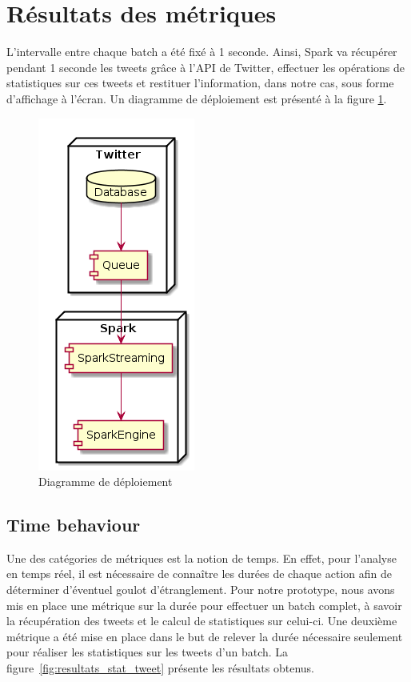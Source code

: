 \section{Résultats des métriques}
  L'intervalle entre chaque batch a été fixé à 1 seconde. Ainsi, Spark va récupérer pendant 1 seconde les tweets grâce à l'API de Twitter, effectuer les opérations de statistiques sur ces tweets et restituer l'information, dans notre cas, sous forme d'affichage à l'écran. Un diagramme de déploiement est présenté à la figure \ref{fig:digramme de déploiement}.

    \begin{figure}
        \centering
        \includegraphics{images/diagramme-deploiement.png}
        \caption{Diagramme de déploiement}
        \label{fig:digramme de déploiement}
    \end{figure}

  \subsection{Time behaviour}
    Une des catégories de métriques est la notion de temps. En effet, pour l'analyse en temps réel, il est nécessaire de connaître les durées de chaque action afin de déterminer d'éventuel goulot d'étranglement. Pour notre prototype, nous avons mis en place une métrique sur la durée pour effectuer un batch complet, à savoir la récupération des tweets et le calcul de statistiques sur celui-ci. Une deuxième métrique a été mise en place dans le but de relever la durée nécessaire seulement pour réaliser les statistiques sur les tweets d'un batch. La figure~\ref{fig:resultats_stat_tweet} présente les résultats obtenus. \\

